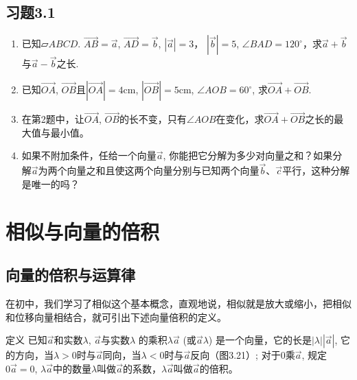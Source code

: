 \subsection*{习题3.1}
\begin{enumerate}
    \item 已知$\parallelogram{ABCD}$. $\Vec{AB}=\vec{a}$, $\Vec{AD}=\vec{b}$, $|\vec{a}|=3$，
$|\vec{b}|=5$, $\angle BAD=120^{\circ}$，求$\vec{a}+\vec{b}$与$\vec{a}-\vec{b}$之长.
\item 已知$\Vec{OA}$, $\Vec{OB}$且$|\Vec{OA}|=4$cm, $|\Vec{OB}|=5$cm, $\angle AOB=60^{\circ}$, 求$\Vec{OA}+\Vec{OB}$.
\item 在第2题中，让$\Vec{OA}$, $\Vec{OB}$的长不变，只有$\angle AOB$在变化，求$\Vec{OA}+\Vec{OB}$之长的最大值与最小值。

\item 如果不附加条件，任给一个向量$\vec{a}$, 你能把它分解为多少对向量之和？如果分解$\vec{a}$为两个向量之和且使这两个向量分别与已知两个向量$\vec{b}$、$\vec{c}$平行，这种分解是唯一的吗？
\end{enumerate}

\section{相似与向量的倍积}
\subsection{向量的倍积与运算律}

在初中，我们学习了相似这个基本概念，直观地说，相似就是放大或缩小，把相似和位移向量相结合，就可引出下述向量倍积的定义。

\begin{blk}
    {定义} 已知$\vec{a}$和实数$\lambda$, $\vec{a}$与实数$\lambda$ 的乘积$\lambda \vec{a}$ (或$\vec{a}\lambda $) 是一个向量，它的长是$|\lambda| \left|\vec{a}\right|$, 它的方向，当$\lambda >0$时与$\vec{a}$同向，当$\lambda <0$时与$\vec{a}$反向（图3.21）; 对于0乘$\vec{a}$, 规定$0\vec{a}=0$, $\lambda \vec{a}$中的数量$\lambda$叫做$\vec{a}$的系数，$\lambda\vec{a}$叫做$\vec{a}$的倍积。
\end{blk}

\begin{figure}[htp]
    \centering
{}
    \caption{}
\end{figure}


